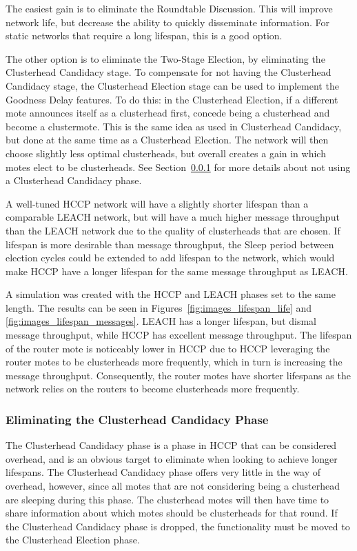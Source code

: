 The easiest gain is to eliminate the Roundtable Discussion. This will improve network life, but decrease the 
ability to quickly disseminate information. For static networks that require a long lifespan, this is a good option.

The other option is to eliminate the Two-Stage Election, by eliminating the Clusterhead Candidacy stage. To compensate
for not having the Clusterhead Candidacy stage, the Clusterhead Election stage can be used to implement
the Goodness Delay features. To do this: in the Clusterhead Election, if a different mote announces itself
as a clusterhead first, concede being a clusterhead and become a clustermote. This is the same idea as used in Clusterhead Candidacy, but
done at the same time as a Clusterhead Election. The network will then choose slightly less optimal clusterheads, 
but overall creates a gain in which motes elect to be clusterheads. See Section~\ref{noCC} for more details about not using 
a Clusterhead Candidacy phase.

A well-tuned HCCP network will have a slightly shorter lifespan than a comparable LEACH network, but will have a
much higher message throughput than the LEACH network due to the quality of clusterheads that are chosen.
If lifespan is more desirable than message throughput, the Sleep period between 
election cycles could be extended to add lifespan to the network, which would make HCCP have a longer
lifespan for the same message throughput as LEACH.

A simulation was created with the HCCP and LEACH phases set to the same length. The results can 
be seen in Figures~\ref{fig:images_lifespan_life} and \ref{fig:images_lifespan_messages}.
LEACH has a longer lifespan, but dismal message throughput, while HCCP has
excellent message throughput. The lifespan of the router mote is noticeably lower in 
HCCP due to HCCP leveraging the router motes to be clusterheads more frequently, which 
in turn is increasing the message throughput. Consequently, the  router motes have 
shorter lifespans as the network relies on the routers to become clusterheads more frequently. 




\subsubsection{Eliminating the Clusterhead Candidacy Phase}
\label{noCC}
The Clusterhead Candidacy phase is a phase in HCCP that can be considered overhead, and 
is an obvious target to eliminate when looking to achieve longer lifespans. The Clusterhead
Candidacy phase offers very little in the way of overhead, however, since all motes that are not considering
being a clusterhead are sleeping during this phase. The clusterhead motes will then 
have time to share information about which motes should be clusterheads for that round. If the
Clusterhead Candidacy phase is dropped, the functionality must be moved to the Clusterhead Election phase.

